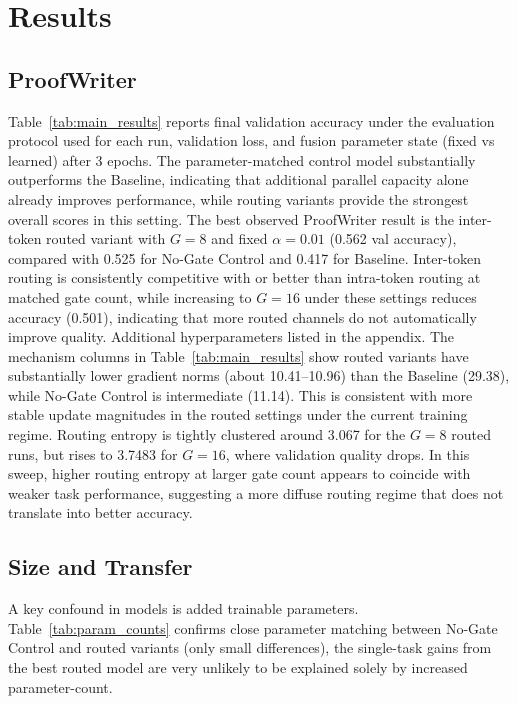 \documentclass[10pt,twocolumn,letterpaper]{article}
\begin{document}
\section{Results}

\subsection{ProofWriter}
Table~\ref{tab:main_results} reports final validation accuracy
under the evaluation protocol used for each run, validation loss, and
fusion parameter state (fixed vs learned) after 3 epochs.
The parameter-matched control model substantially outperforms the
Baseline, indicating that additional parallel capacity alone
already improves performance, while routing variants
provide the strongest overall scores in this setting.
The best observed ProofWriter result is the inter-token routed variant with
$G=8$ and fixed $\alpha=0.01$ (0.562 val accuracy), compared with 0.525 for
No-Gate Control and 0.417 for Baseline. Inter-token routing is consistently
competitive with or better than intra-token routing at matched gate count,
while increasing to $G=16$ under these settings reduces accuracy (0.501),
indicating that more routed channels do not automatically improve quality.
Additional hyperparameters listed in the appendix.
The mechanism columns in Table~\ref{tab:main_results} show routed variants
have substantially lower gradient norms
(about 10.41--10.96) than the Baseline (29.38), while No-Gate Control is
intermediate (11.14). This is consistent with more stable update magnitudes in
the routed settings under the current training regime. Routing entropy is
tightly clustered around 3.067 for the $G=8$ routed runs, but rises to 3.7483
for $G=16$, where validation quality drops. In this sweep, higher routing
entropy at larger gate count appears to coincide with weaker task performance,
suggesting a more diffuse routing regime that does not translate into better
accuracy.

\subsection{Size and Transfer}

A key confound in models is added trainable parameters.
Table~\ref{tab:param_counts} confirms close parameter matching between No-Gate
Control and routed variants  (only small differences),
the single-task gains from the best routed model are
very unlikely to be explained solely by increased parameter-count.
\end{document}
